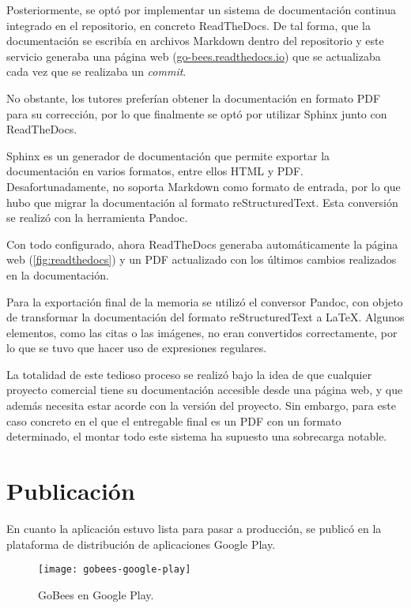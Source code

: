 Posteriormente, se optó por implementar un sistema de documentación
continua integrado en el repositorio, en concreto ReadTheDocs. De tal
forma, que la documentación se escribía en archivos Markdown dentro del
repositorio y este servicio generaba una página web
(\href{http://go-bees.readthedocs.io/}{go-bees.readthedocs.io}) que se
actualizaba cada vez que se realizaba un \emph{commit}.

No obstante, los tutores preferían obtener la documentación en formato
PDF para su corrección, por lo que finalmente se optó por utilizar
Sphinx junto con ReadTheDocs.

Sphinx es un generador de documentación que permite exportar la
documentación en varios formatos, entre ellos HTML y PDF.
Desafortunadamente, no soporta Markdown como formato de entrada, por
lo que hubo que migrar la documentación al formato reStructuredText.
Esta conversión se realizó con la herramienta Pandoc.

Con todo configurado, ahora ReadTheDocs generaba automáticamente la
página web (\ref{fig:readthedocs}) y un PDF actualizado con los 
últimos cambios realizados en la documentación.


Para la exportación final de la memoria se utilizó el conversor Pandoc,
con objeto de transformar la documentación del formato reStructuredText
a \LaTeX. Algunos elementos, como las citas o las imágenes, no eran
convertidos correctamente, por lo que se tuvo que hacer uso de
expresiones regulares.

La totalidad de este tedioso proceso se realizó bajo la idea de que
cualquier proyecto comercial tiene su documentación accesible desde una
página web, y que además necesita estar acorde con la versión del
proyecto. Sin embargo, para este caso concreto en el que el entregable
final es un PDF con un formato determinado, el montar todo este sistema
ha supuesto una sobrecarga notable.

\section{Publicación}\label{publicacion}

En cuanto la aplicación estuvo lista para pasar a producción, se publicó
en la plataforma de distribución de aplicaciones Google Play.

\begin{figure}[H]
		\centering
	\texttt{[image: gobees-google-play]}
	\caption{GoBees en Google Play.}\label{fig:gobees-google-play}
\end{figure}

